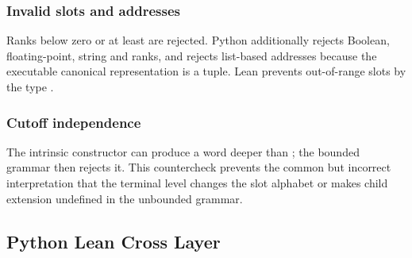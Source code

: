 \subsubsection{Invalid slots and
addresses}\label{invalid-slots-and-addresses}

Ranks below zero or at least \texttt{\protect{}} are rejected. Python
additionally rejects Boolean, floating-point, string and \texttt{\protect{}}
ranks, and rejects list-based addresses because the executable canonical
representation is a tuple. Lean prevents out-of-range slots by the type
\texttt{\protect{}}.

\subsubsection{Cutoff independence}\label{cutoff-independence}

The intrinsic constructor can produce a word deeper than \texttt{\protect{}}; the
bounded grammar then rejects it. This countercheck prevents the common
but incorrect interpretation that the terminal level changes the slot
alphabet or makes child extension undefined in the unbounded grammar.

\subsection{Python Lean Cross Layer}\label{python-lean-cross-layer-1}

